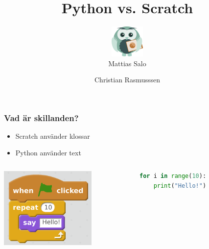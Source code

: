 \documentclass{beamer}
\author[Mattias Salo \and Christian Rasmussen]{\includegraphics[width=1.7cm]{../logo.png}\\Mattias Salo \and Christian Rasmusssen}
\title{Python vs. Scratch}
\institute{CoderDojo Linköping}
\begin{document}
\begin{frame}
\maketitle
\end{frame}


\begin{frame}[fragile]
	\frametitle{Vad är skillanden?}

	\begin{itemize}
		\item{Scratch använder klossar}
		\item{Python använder text}
	\end{itemize}
	\begin{columns}[c] %
    \begin{center}
     \includegraphics[width=0.7\textwidth]{blocks/for_10.png}
     \end{center}
\begin{lstlisting}[language=Python]
for i in range(10):
    print("Hello!")
\end{lstlisting}
    \end{columns}
\end{frame}
\end{document}
